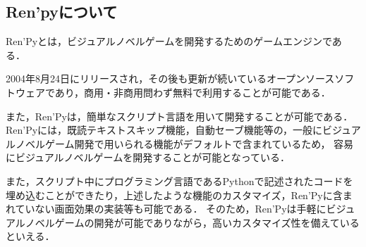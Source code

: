 \subsection{Ren'pyについて}

Ren'Pyとは，ビジュアルノベルゲームを開発するためのゲームエンジンである．
    
2004年8月24日にリリースされ，その後も更新が続いているオープンソースソフトウェアであり，商用・非商用問わず無料で利用することが可能である．

また，Ren'Pyは，簡単なスクリプト言語を用いて開発することが可能である．
Ren'Pyには，既読テキストスキップ機能，自動セーブ機能等の，一般にビジュアルノベルゲーム開発で用いられる機能がデフォルトで含まれているため，
容易にビジュアルノベルゲームを開発することが可能となっている．

また，スクリプト中にプログラミング言語であるPythonで記述されたコードを埋め込むことができたり，上述したような機能のカスタマイズ，Ren'Pyに含まれていない画面効果の実装等も可能である．
そのため，Ren'Pyは手軽にビジュアルノベルゲームの開発が可能でありながら，高いカスタマイズ性を備えているといえる．
